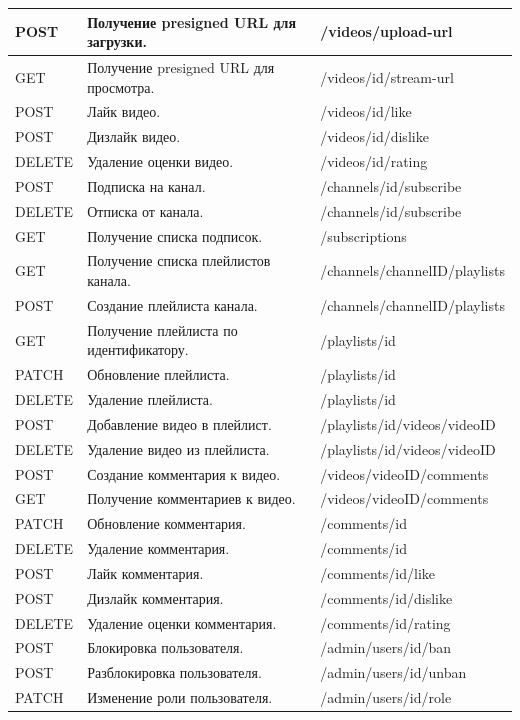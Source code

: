 \begin{longtable}{|p{1.8cm}|p{7.2cm}|p{6.2cm}|}
    \hline
    POST & Получение presigned URL для загрузки. & /videos/upload-url \\
    \hline
    GET & Получение presigned URL для просмотра. & /videos/{id}/stream-url \\
    \hline
    POST & Лайк видео. & /videos/{id}/like \\
    \hline
    POST & Дизлайк видео. & /videos/{id}/dislike \\
    \hline
    DELETE & Удаление оценки видео. & /videos/{id}/rating \\
    \hline
    POST & Подписка на канал. & /channels/{id}/subscribe \\
    \hline
    DELETE & Отписка от канала. & /channels/{id}/subscribe \\
    \hline
    GET & Получение списка подписок. & /subscriptions \\
    \hline
    GET & Получение списка плейлистов канала. & /channels/{channelID}/playlists \\
    \hline
    POST & Создание плейлиста канала. & /channels/{channelID}/playlists \\
    \hline
    GET & Получение плейлиста по идентификатору. & /playlists/{id} \\
    \hline
    PATCH & Обновление плейлиста. & /playlists/{id} \\
    \hline
    DELETE & Удаление плейлиста. & /playlists/{id} \\
    \hline
    POST & Добавление видео в плейлист. & /playlists/{id}/videos/{videoID} \\
    \hline
    DELETE & Удаление видео из плейлиста. & /playlists/{id}/videos/{videoID} \\
    \hline
    POST & Создание комментария к видео. & /videos/{videoID}/comments \\
    \hline
    GET & Получение комментариев к видео. & /videos/{videoID}/comments \\
    \hline
    PATCH & Обновление комментария. & /comments/{id} \\
    \hline
    DELETE & Удаление комментария. & /comments/{id} \\
    \hline
    POST & Лайк комментария. & /comments/{id}/like \\
    \hline
    POST & Дизлайк комментария. & /comments/{id}/dislike \\
    \hline
    DELETE & Удаление оценки комментария. & /comments/{id}/rating \\
    \hline
    POST & Блокировка пользователя. & /admin/users/{id}/ban \\
    \hline
    POST & Разблокировка пользователя. & /admin/users/{id}/unban \\
    \hline
    PATCH & Изменение роли пользователя. & /admin/users/{id}/role \\
    \hline
\end{longtable}

\clearpage



